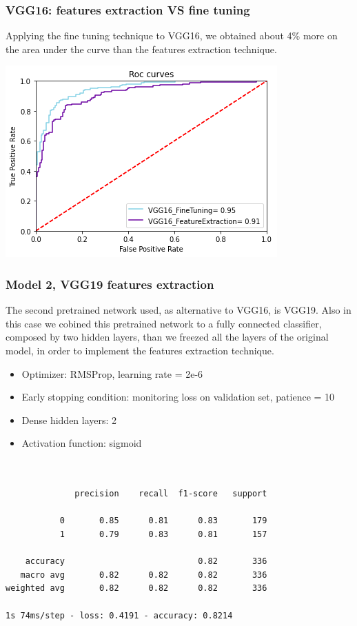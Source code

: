 \documentclass{article}
\begin{document}
\subsubsection{VGG16: features extraction VS fine tuning}
Applying the fine tuning technique to VGG16, we obtained about 4\% more on the area under the curve than the features extraction technique.
\begin{center}
\begin{minipage}{0.45\textwidth}
        \includegraphics[scale=0.6]{./img/rocVGG16.png}
    \end{minipage}
\end{center}



\subsubsection{Model 2, VGG19 features extraction}
The second pretrained network used, as alternative to VGG16, is VGG19. Also in this case we cobined this pretrained network to a fully connected classifier, composed by two hidden layers, than we freezed all the layers of the original model, in order to implement the features extraction technique.

\begin{itemize}
\item Optimizer: RMSProp, learning rate = 2e-6
\item Early stopping condition: monitoring loss on validation set, patience = 10
\item Dense hidden layers: 2
\item Activation function: sigmoid
\end{itemize}

\begin{verbatim}


              precision    recall  f1-score   support

           0       0.85      0.81      0.83       179
           1       0.79      0.83      0.81       157

    accuracy                           0.82       336
   macro avg       0.82      0.82      0.82       336
weighted avg       0.82      0.82      0.82       336

1s 74ms/step - loss: 0.4191 - accuracy: 0.8214

\end{verbatim}
\end{document}
